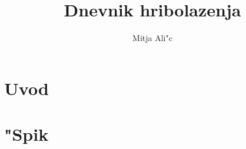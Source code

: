 \documentclass[10pt,a4paper,twoside]{book}
\author{Mitja Ali"c}
\title{Dnevnik hribolazenja}
\begin{document}
\chapter*{Uvod}

\chapter{"Spik}
\end{document}
